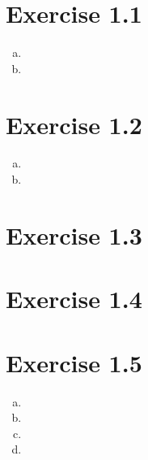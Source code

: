 \documentclass{article} %
\newcommand{\homeworkNumber}{1}
\begin{document}
\section*{Exercise \homeworkNumber.1}

\begin{enumerate}[(a)]
	\item
	\item
\end{enumerate}



\section*{Exercise \homeworkNumber.2}

\begin{enumerate}[(a)]
	\item
	\item
\end{enumerate}



\section*{Exercise \homeworkNumber.3}



\section*{Exercise \homeworkNumber.4}



\section*{Exercise \homeworkNumber.5}

\begin{enumerate}[(a)]
	\item
	\item
	\item
	\item
\end{enumerate}
\end{document}
